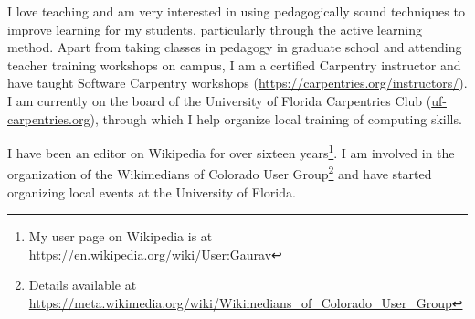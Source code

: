 \documentclass[12pt,letter]{article}
\begin{document}
I love teaching and am very interested in using pedagogically sound techniques to improve learning for my students, particularly through the active learning method. Apart from taking classes in pedagogy in graduate school and attending teacher training workshops on campus, I am a certified Carpentry instructor and have taught Software Carpentry workshops (\url{https://carpentries.org/instructors/}). I am currently on the board of the University of Florida Carpentries Club (\href{http://uf-carpentries.org/}{uf-carpentries.org}), through which I help organize local training of computing skills.

I have been an editor on Wikipedia for over sixteen years\footnote{My user page on Wikipedia is at \url{https://en.wikipedia.org/wiki/User:Gaurav}}. I am involved in the organization of the Wikimedians of Colorado User Group\footnote{Details available at \url{https://meta.wikimedia.org/wiki/Wikimedians\_of\_Colorado\_User\_Group}} and have started organizing local events at the University of Florida.

\begin{comment}
\begin{center}

\small

\textit{Prepared on \today.}

\end{center}
\end{comment}
\end{document}
